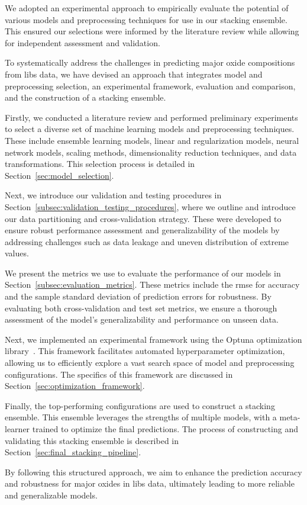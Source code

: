 We adopted an experimental approach to empirically evaluate the potential of various models and preprocessing techniques for use in our stacking ensemble. 
This ensured our selections were informed by the literature review while allowing for independent assessment and validation.

To systematically address the challenges in predicting major oxide compositions from \gls{libs} data, we have devised an approach that integrates model and preprocessing selection, an experimental framework, evaluation and comparison, and the construction of a stacking ensemble.

Firstly, we conducted a literature review and performed preliminary experiments to select a diverse set of machine learning models and preprocessing techniques.
These include ensemble learning models, linear and regularization models, neural network models, scaling methods, dimensionality reduction techniques, and data transformations.
This selection process is detailed in Section~\ref{sec:model_selection}.

Next, we introduce our validation and testing procedures in Section~\ref{subsec:validation_testing_procedures}, where we outline and introduce our data partitioning and cross-validation strategy.
These were developed to ensure robust performance assessment and generalizability of the models by addressing challenges such as data leakage and uneven distribution of extreme values.

We present the metrics we use to evaluate the performance of our models in Section~\ref{subsec:evaluation_metrics}.
These metrics include the \gls{rmse} for accuracy and the sample standard deviation of prediction errors for robustness.
By evaluating both cross-validation and test set metrics, we ensure a thorough assessment of the model's generalizability and performance on unseen data.

Next, we implemented an experimental framework using the Optuna optimization library~\cite{optuna_2019}.
This framework facilitates automated hyperparameter optimization, allowing us to efficiently explore a vast search space of model and preprocessing configurations.
The specifics of this framework are discussed in Section~\ref{sec:optimization_framework}.

Finally, the top-performing configurations are used to construct a stacking ensemble.
This ensemble leverages the strengths of multiple models, with a meta-learner trained to optimize the final predictions.
The process of constructing and validating this stacking ensemble is described in Section~\ref{sec:final_stacking_pipeline}.

By following this structured approach, we aim to enhance the prediction accuracy and robustness for major oxides in \gls{libs} data, ultimately leading to more reliable and generalizable models.




